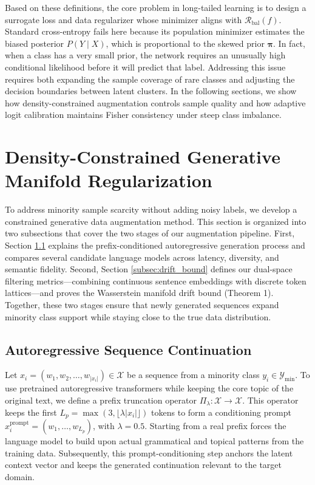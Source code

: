 \documentclass[10pt,journal,compsoc]{IEEEtran}
\begin{document}
Based on these definitions, the core problem in long-tailed learning is to design a surrogate loss and data regularizer whose minimizer aligns with $\mathcal{R}_{\text{bal}}(f)$. Standard cross-entropy fails here because its population minimizer estimates the biased posterior $P(Y \mid X)$, which is proportional to the skewed prior $\boldsymbol{\pi}$. In fact, when a class has a very small prior, the network requires an unusually high conditional likelihood before it will predict that label. Addressing this issue requires both expanding the sample coverage of rare classes and adjusting the decision boundaries between latent clusters. In the following sections, we show how density-constrained augmentation controls sample quality and how adaptive logit calibration maintains Fisher consistency under steep class imbalance.

\section{Density-Constrained Generative Manifold Regularization}
\label{sec:manifold_augmentation}

To address minority sample scarcity without adding noisy labels, we develop a constrained generative data augmentation method. This section is organized into two subsections that cover the two stages of our augmentation pipeline. First, Section \ref{subsec:continuation} explains the prefix-conditioned autoregressive generation process and compares several candidate language models across latency, diversity, and semantic fidelity. Second, Section \ref{subsec:drift_bound} defines our dual-space filtering metrics—combining continuous sentence embeddings with discrete token lattices—and proves the Wasserstein manifold drift bound (Theorem 1). Together, these two stages ensure that newly generated sequences expand minority class support while staying close to the true data distribution.


\subsection{Autoregressive Sequence Continuation}
\label{subsec:continuation}

Let $x_i = (w_1, w_2, \dots, w_{|x_i|}) \in \mathcal{X}$ be a sequence from a minority class $y_i \in \mathcal{Y}_{\text{min}}$. To use pretrained autoregressive transformers while keeping the core topic of the original text, we define a prefix truncation operator $\Pi_\lambda: \mathcal{X} \to \mathcal{X}$. This operator keeps the first $L_p = \max(3, \lfloor \lambda |x_i| \rfloor)$ tokens to form a conditioning prompt $x_i^{\text{prompt}} = (w_1, \dots, w_{L_p})$, with $\lambda = 0.5$. Starting from a real prefix forces the language model to build upon actual grammatical and topical patterns from the training data. Subsequently, this prompt-conditioning step anchors the latent context vector and keeps the generated continuation relevant to the target domain.
\end{document}
